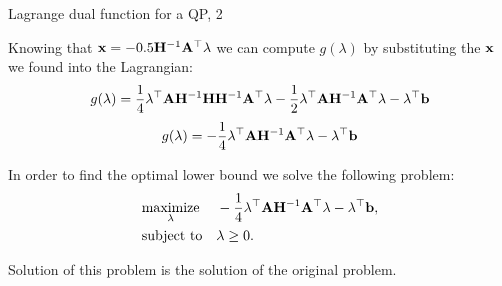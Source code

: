 \documentclass{beamer}
\begin{document}
\begin{frame}{Lagrange dual function for a QP, 2}
	\begin{flushleft}
		
		Knowing that $\mathbf{x} = -0.5\mathbf{H}^{-1}\mathbf{A}^\top \lambda$ we can compute $g(\lambda)$ by substituting the $\mathbf{x}$ we found into the Lagrangian:
		\begin{equation}
			g(\lambda) = \frac{1}{4} \lambda^\top \mathbf{A}\mathbf{H}^{-1}\mathbf{H}\mathbf{H}^{-1}\mathbf{A}^\top\lambda - \frac{1}{2} \lambda^\top \mathbf{A}\mathbf{H}^{-1}\mathbf{A}^\top \lambda - \lambda^\top\mathbf{b}
		\end{equation}
	\begin{equation}
		g(\lambda) = -\frac{1}{4} \lambda^\top \mathbf{A}\mathbf{H}^{-1}\mathbf{A}^\top\lambda - \lambda^\top\mathbf{b}
	\end{equation}
		
		In order to find the optimal lower bound we solve the following problem:
		\begin{equation}
			\begin{aligned}
				& \underset{\lambda}{\text{maximize}}
				& & -\frac{1}{4} \lambda^\top \mathbf{A}\mathbf{H}^{-1}\mathbf{A}^\top\lambda - \lambda^\top\mathbf{b}, \\
				& \text{subject to}
				& & \lambda \geq 0.
			\end{aligned}
		\end{equation}
		
		Solution of this problem is the solution of the original problem.
		
	\end{flushleft}
\end{frame}
\end{document}
